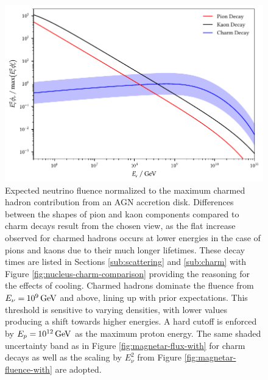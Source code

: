 \begin{figure}[H]
	\centering
	\includegraphics{../plots/build/nucleus_neutrino_spectrum.pdf}
	\caption[AGN accretion disk $\nu \kern+0.5pt$ fluence compared to $c$ decay.]
			{Expected neutrino fluence normalized to the maximum charmed hadron contribution from an AGN accretion disk.
			 Differences between the shapes of pion and kaon components compared to charm decays result from the chosen
			 view, as the flat increase observed for charmed hadrons occurs at lower energies in the case of pions and kaons
			 due to their much longer lifetimes. These decay times are listed in Sections \ref{sub:scattering} and \ref{sub:charm}
			 with Figure \ref{fig:nucleus-charm-comparison} providing the reasoning for the effects of cooling. Charmed hadrons dominate
			 the fluence from $E_\nu = \kern-0.5pt \qty{e9}{\giga\electronvolt}$ and above, lining up with prior expectations. This
			 threshold is sensitive to varying densities, with lower values producing a shift towards higher energies. A hard cutoff
			 is enforced by $E_p = \kern-0.5pt \qty{e12}{\giga\electronvolt}$ as the maximum proton energy. The same shaded uncertainty
			 band as in Figure \ref{fig:magnetar-flux-with} for charm decays as well as the scaling by $E_\nu^2$ from
			 Figure \ref{fig:magnetar-fluence-with} are adopted.}
	\label{fig:nucleus-fluence}
\end{figure}
